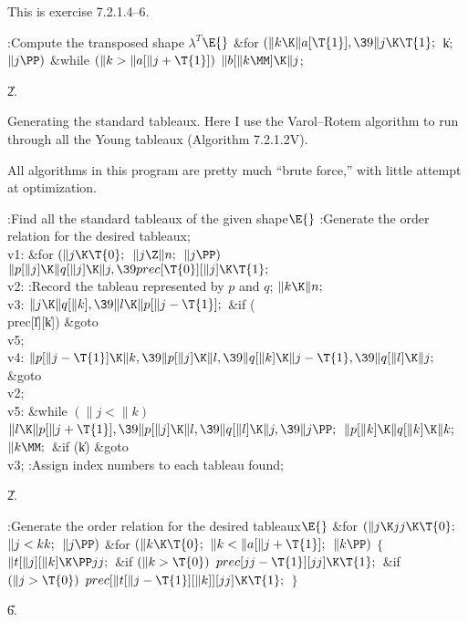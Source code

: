 This is exercise 7.2.1.4--6.

\Y\B\4:Compute the transposed shape $\lambda^T$\X${}\E{}$\6
\&{for} ${}(\|k\K\|a[\T{1}],\39\|j\K\T{1};{}$ \|k; ${}\|j\PP){}$\1\6
\&{while} ${}(\|k>\|a[\|j+\T{1}]){}$\1\5
${}\|b[\|k\MM]\K\|j{}$;\2\2\par
\U2.\fi

Generating the standard tableaux. Here I use the
Varol--Rotem algorithm
to run through all the Young tableaux (Algorithm 7.2.1.2V).

All algorithms in this program are pretty much ``brute force,'' with
little attempt at optimization.

\Y\B\4:Find all the standard tableaux of the given shape\X${}\E{}$\6
:Generate the order relation for the desired tableaux\X;\6
\4\\{v1}:\5
\&{for} ${}(\|j\K\T{0};{}$ ${}\|j\Z\|n;{}$ ${}\|j\PP){}$\1\5
${}\|p[\|j]\K\|q[\|j]\K\|j,\39\\{prec}[\T{0}][\|j]\K\T{1};{}$\2\6
\4\\{v2}:\5
:Record the tableau represented by $p$ and $q$\X;\6
${}\|k\K\|n;{}$\6
\4\\{v3}:\5
${}\|j\K\|q[\|k],\39\|l\K\|p[\|j-\T{1}];{}$\6
\&{if} (\\{prec}[\|l][\|k])\1\5
\&{goto} \\{v5};\2\6
\4\\{v4}:\5
${}\|p[\|j-\T{1}]\K\|k,\39\|p[\|j]\K\|l,\39\|q[\|k]\K\|j-\T{1},\39\|q[\|l]\K%
\|j;{}$\6
\&{goto} \\{v2};\6
\4\\{v5}:\5
\&{while} ${}(\|j<\|k){}$\1\5
${}\|l\K\|p[\|j+\T{1}],\39\|p[\|j]\K\|l,\39\|q[\|l]\K\|j,\39\|j\PP;{}$\2\6
${}\|p[\|k]\K\|q[\|k]\K\|k;{}$\6
${}\|k\MM;{}$\6
\&{if} (\|k)\1\5
\&{goto} \\{v3};\2\6
:Assign index numbers to each tableau found\X;\par
\U2.\fi

\B{}:Generate the order relation for the desired
tableaux\X${}\E{}$\6
\&{for} ${}(\|j\K\\{jj}\K\T{0};{}$ ${}\|j<\\{kk};{}$ ${}\|j\PP){}$\1\6
\&{for} ${}(\|k\K\T{0};{}$ ${}\|k<\|a[\|j+\T{1}];{}$ ${}\|k\PP){}$\5
${}\{{}$\1\6
${}\|t[\|j][\|k]\K\PP\\{jj};{}$\6
\&{if} ${}(\|k>\T{0}){}$\1\5
${}\\{prec}[\\{jj}-\T{1}][\\{jj}]\K\T{1};{}$\2\6
\&{if} ${}(\|j>\T{0}){}$\1\5
${}\\{prec}[\|t[\|j-\T{1}][\|k]][\\{jj}]\K\T{1};{}$\2\6
\4${}\}{}$\2\2\par
\U6.\fi

